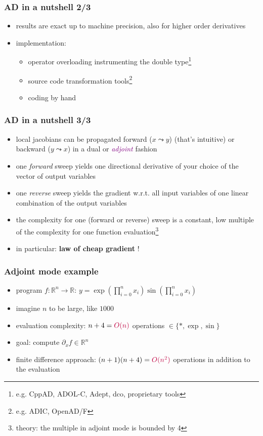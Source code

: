 \documentclass[10pt,German]{beamer}
\begin{document}
\begin{frame}[fragile]
\frametitle{AD in a nutshell 2/3}
\begin{itemize}
\item results are exact up to machine precision, also for higher order derivatives
\item implementation: \begin{itemize}
\item operator overloading instrumenting the double type\footnote{e.g. CppAD, ADOL-C, Adept, dco, proprietary tools}
\item source code transformation tools\footnote{e.g. ADIC, OpenAD/F}
\item coding by hand
\end{itemize}
\end{itemize}
\end{frame}

\begin{frame}[fragile]
\frametitle{AD in a nutshell 3/3}
\begin{itemize}
\item local jacobians can be propagated forward ($x\leadsto y$) (that's intuitive)  or backward ($y\leadsto x$) in a dual or \textcolor{purple}{\textit{adjoint}} fashion
\item one \textit{forward} sweep yields one directional derivative of your choice of the vector of output variables
\item one \textit{reverse} sweep yields the gradient w.r.t. all input variables of one linear combination of the output variables
\item the complexity for one (forward or reverse) sweep is a constant, low multiple of the complexity for one function evaluation\footnote{theory: the multiple in adjoint mode is bounded by 4}
\item in particular: \textbf{law of cheap gradient} !
\end{itemize}
\end{frame}

\begin{frame}[fragile]
\frametitle{Adjoint mode example}
\begin{itemize}
\item program $f:\mathbb{R}^n\rightarrow\mathbb{R}$: $y = \exp\left( \prod_{i=0}^n x_i \right) \sin\left( \prod_{i=0}^n x_i \right)$
\item imagine $n$ to be large, like $1000$
\item evaluation complexity: $n+4=\textcolor{purple}{O(n)}$ operations $\in \{*, \exp, \sin \}$
\item goal: compute $\partial_x f \in \mathbb{R}^n$
\item finite difference approach: $(n+1)(n+4) = \textcolor{purple}{O(n^2)}$ operations in addition to the evaluation
\end{itemize}
\end{frame}
\end{document}
